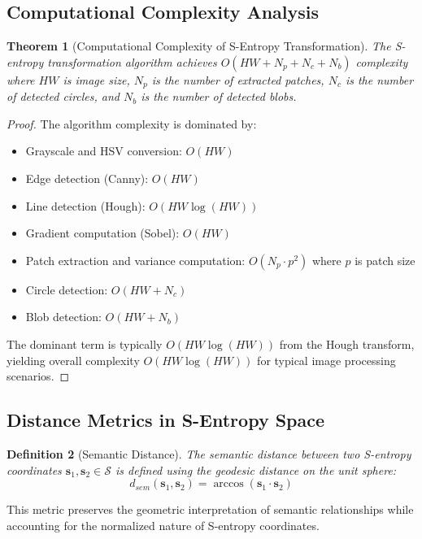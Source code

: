 \documentclass[11pt,a4paper]{article}
\newtheorem{theorem}{Theorem}[section]
\newtheorem{definition}[theorem]{Definition}
\begin{document}
\subsection{Computational Complexity Analysis}

\begin{theorem}[Computational Complexity of S-Entropy Transformation]
The S-entropy transformation algorithm achieves $O(HW + N_p + N_c + N_b)$ complexity where $HW$ is image size, $N_p$ is the number of extracted patches, $N_c$ is the number of detected circles, and $N_b$ is the number of detected blobs.
\end{theorem}

\begin{proof}
The algorithm complexity is dominated by:
\begin{itemize}
\item Grayscale and HSV conversion: $O(HW)$
\item Edge detection (Canny): $O(HW)$
\item Line detection (Hough): $O(HW \log(HW))$
\item Gradient computation (Sobel): $O(HW)$
\item Patch extraction and variance computation: $O(N_p \cdot p^2)$ where $p$ is patch size
\item Circle detection: $O(HW + N_c)$
\item Blob detection: $O(HW + N_b)$
\end{itemize}
The dominant term is typically $O(HW \log(HW))$ from the Hough transform, yielding overall complexity $O(HW \log(HW))$ for typical image processing scenarios.
\end{proof}

\subsection{Distance Metrics in S-Entropy Space}

\begin{definition}[Semantic Distance]
The semantic distance between two S-entropy coordinates $\mathbf{s}_1, \mathbf{s}_2 \in \mathcal{S}$ is defined using the geodesic distance on the unit sphere:
\begin{equation}
d_{sem}(\mathbf{s}_1, \mathbf{s}_2) = \arccos(\mathbf{s}_1 \cdot \mathbf{s}_2)
\label{eq:semantic-distance}
\end{equation}
\end{definition}

This metric preserves the geometric interpretation of semantic relationships while accounting for the normalized nature of S-entropy coordinates.
\end{document}
